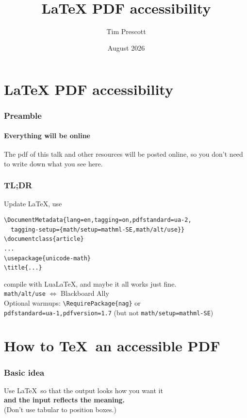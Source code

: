 \documentclass{ltx-talk}
\title{\texorpdfstring{\LaTeX}{LaTeX} PDF accessibility}
\author{Tim Prescott}
\institute[UND]{University of North Dakota}
\date{August 2026}
\begin{document}
\section{\texorpdfstring{\LaTeX}{LaTeX} PDF accessibility}

\begin{frame}
\maketitle
\end{frame}

\begin{frame}
\frametitle{Preamble}
\framesubtitle{Everything will be online}
The pdf of this talk and other resources will be posted online, so you don't need to write down what you see here.
\end{frame}


\begin{frame*}
\frametitle{TL;DR}
Update \LaTeX, use
\begin{verbatim}
\DocumentMetadata{lang=en,tagging=on,pdfstandard=ua-2,
  tagging-setup={math/setup=mathml-SE,math/alt/use}}
\documentclass{article}
...
\usepackage{unicode-math}
\title{...}
\end{verbatim}
compile with Lua\LaTeX, and maybe it all works just fine.\\
\texttt{math/alt/use} $\Leftrightarrow$ Blackboard Ally\\\bigskip
Optional warmups: \verb|\RequirePackage{nag}| or\\
\qquad\texttt{pdfstandard=ua-1,pdfversion=1.7} (but not \texttt{math/setup=mathml-SE})
\end{frame*}

\section{How to \TeX\ an accessible PDF}

\begin{frame}
\frametitle{Basic idea}
Use \LaTeX\ so that the output looks how you want it\\
\textbf{and the input reflects the meaning.}\\
(Don't use tabular to position boxes.)
\end{frame}
\end{document}
